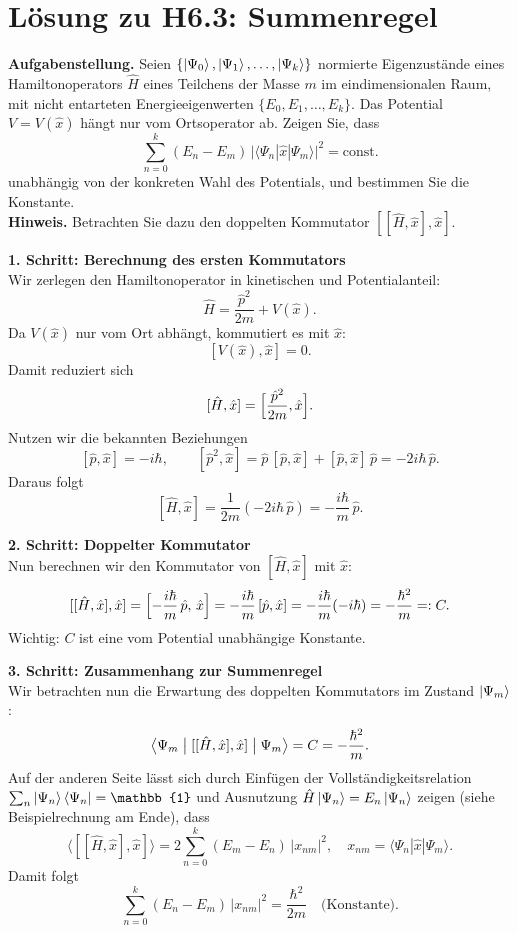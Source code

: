 \documentclass[12pt]{scrartcl}
\begin{document}
\section*{Lösung zu H6.3: Summenregel}

\textbf{Aufgabenstellung.}
Seien $\{\ket{\Psi_0},\ket{\Psi_1},\dots,\ket{\Psi_k}\}$ normierte Eigenzustände eines Hamiltonoperators
$\hat H$ eines Teilchens der Masse $m$ im eindimensionalen Raum, mit nicht entarteten Energieeigenwerten
$\{E_0,E_1,\dots,E_k\}$. Das Potential $V=V(\hat x)$ hängt nur vom Ortsoperator ab. Zeigen Sie, dass
\[
  \sum_{n=0}^k (E_n - E_m)\,\bigl|\langle \Psi_n | \hat x | \Psi_m \rangle\bigr|^2 = \mathrm{const.}
\]
unabhängig von der konkreten Wahl des Potentials, und bestimmen Sie die Konstante.\\

\textbf{Hinweis.} Betrachten Sie dazu den doppelten Kommutator
\(
  [[\hat H,\hat x],\hat x]
\).

\bigskip

\textbf{1. Schritt: Berechnung des ersten Kommutators}\\
Wir zerlegen den Hamiltonoperator in kinetischen und Potentialanteil:
\[
  \hat H = \frac{\hat p^2}{2m} + V(\hat x).
\]
Da $V(\hat x)$ nur vom Ort abhängt, kommutiert es mit $\hat x$:
\[
  [V(\hat x),\hat x] = 0.
\]
Damit reduziert sich
\[
  [\hat H,\hat x] = \Bigl[\frac{\hat p^2}{2m},\hat x\Bigr].
\]
Nutzen wir die bekannten Beziehungen
\[
  [\hat p,\hat x] = -i\hbar,
  \qquad
  [\hat p^2,\hat x] = \hat p\,[\hat p,\hat x] + [\hat p,\hat x]\,\hat p = -2i\hbar\,\hat p.
\]
Daraus folgt
\[
  [\hat H,\hat x] = \frac{1}{2m}(-2i\hbar\,\hat p) = -\frac{i\hbar}{m}\,\hat p.
\]

\textbf{2. Schritt: Doppelter Kommutator}\\
Nun berechnen wir den Kommutator von $[\hat H,\hat x]$ mit $\hat x$:
\[
  [[\hat H,\hat x],\hat x]
  = \Bigl[-\frac{i\hbar}{m}\,\hat p,\,\hat x\Bigr]
  = -\frac{i\hbar}{m}\,[\hat p,\hat x]
  = -\frac{i\hbar}{m}(-i\hbar)
  = -\frac{\hbar^2}{m}
  =: C.
\]
Wichtig: $C$ ist eine vom Potential unabhängige Konstante.

\textbf{3. Schritt: Zusammenhang zur Summenregel}\\
Wir betrachten nun die Erwartung des doppelten Kommutators im Zustand $\ket{\Psi_m}$:
\[
  \bigl\langle \Psi_m \bigm| [[\hat H,\hat x],\hat x] \bigm| \Psi_m \bigr\rangle
  = C
  = -\frac{\hbar^2}{m}.
\]
Auf der anderen Seite lässt sich durch Einfügen der Vollständigkeitsrelation
$\sum_n \ket{\Psi_n}\bra{\Psi_n}=\mathbb{1}$ und Ausnutzung
$\hat H\ket{\Psi_n}=E_n\ket{\Psi_n}$ zeigen (siehe Beispielrechnung am Ende), dass
\[
  \bigl\langle [[\hat H,\hat x],\hat x]\bigr\rangle
  = 2\sum_{n=0}^k (E_m - E_n)\,\bigl|x_{nm}\bigr|^2,
  \quad x_{nm}=\langle\Psi_n|\hat x|\Psi_m\rangle.
\]
Damit folgt
\[
  \sum_{n=0}^k (E_n - E_m)\,\bigl|x_{nm}\bigr|^2 = \frac{\hbar^2}{2m}
  \quad\text{(Konstante).}
\]
\end{document}
